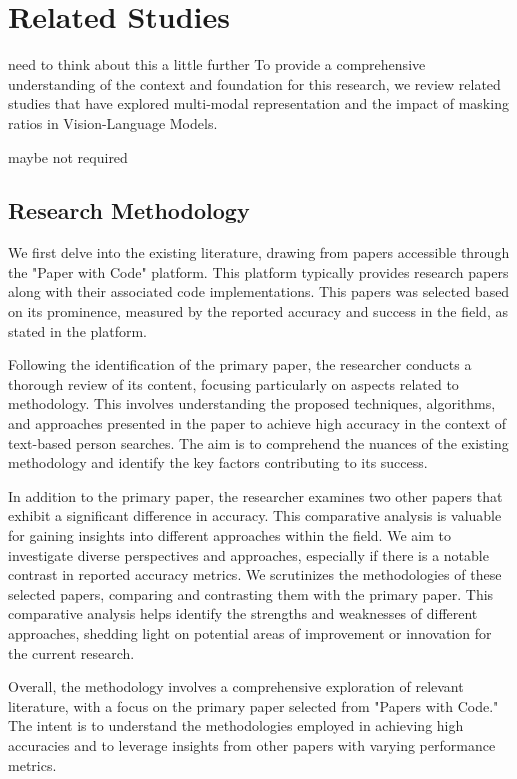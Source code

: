 \chapter{Related Studies }
{\color{red} need to think about this a little further}
To provide a comprehensive understanding of the context and foundation for this research, we review related studies that have explored multi-modal representation and the impact of masking ratios in Vision-Language Models.

{\color{red}maybe not required}
\section{Research Methodology}
We first delve into the existing literature, drawing from papers accessible through the "Paper with Code" platform. This platform typically provides research papers along with their associated code implementations. {\color{red}This papers was selected based on its prominence, measured by the reported accuracy and success in the field, as stated in the platform.}

Following the identification of the primary paper, the researcher conducts a thorough review of its content, focusing particularly on aspects related to methodology. This involves understanding the proposed techniques, algorithms, and approaches presented in the paper to achieve high accuracy in the context of text-based person searches. The aim is to comprehend the nuances of the existing methodology and identify the key factors contributing to its success.

In addition to the primary paper, the researcher examines two other papers that exhibit a significant difference in accuracy. This comparative analysis is valuable for gaining insights into different approaches within the field. We aim to investigate diverse perspectives and approaches, especially if there is a notable contrast in reported accuracy metrics.
We scrutinizes the methodologies of these selected papers, comparing and contrasting them with the primary paper. This comparative analysis helps identify the strengths and weaknesses of different approaches, shedding light on potential areas of improvement or innovation for the current research.

Overall, the methodology involves a comprehensive exploration of relevant literature, with a focus on the primary paper selected from "Papers with Code." The intent is to understand the methodologies employed in achieving high accuracies and to leverage insights from other papers with varying performance metrics. 

